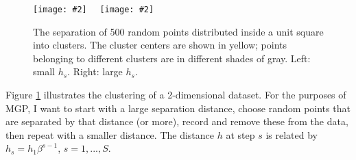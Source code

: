 \documentclass[11pt,a4paper,notitlepage]{article}
\newcommand{\pic}[2]{\texttt{[image: \#2]}}
\begin{document}
\begin{figure}[hb]
\centering
\pic{0.4}{mgp2d1.png}~~
\pic{0.4}{mgp2d2.png}
\caption{The separation of 500 random points distributed inside a unit square into clusters.
The cluster centers are shown in yellow; points belonging to different clusters are in different shades of gray. Left: small $h_s$. Right: large $h_s$.}\label{mgp2d1}
\end{figure}

Figure \ref{mgp2d1} illustrates the clustering of a 2-dimensional dataset. For the purposes of MGP, I want to start with a large separation distance, choose random points that are separated by that distance (or more), record and remove these from the data, then repeat with a smaller distance. The distance $h$ at step $s$ is related by $h_s = h_1\beta^{s-1}$, $s=1,...,S$.
\end{document}
